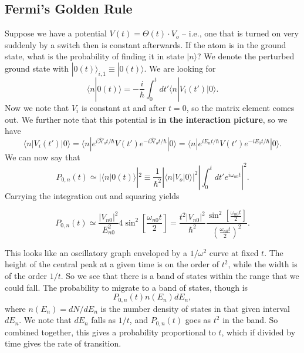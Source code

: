 \documentclass[fontsize=12pt]{scrartcl}
\newcommand{\la}{\langle}
\newcommand{\ra}{\rangle}
\newcommand{\Ham}{\hat{\mathcal{H}}}
\begin{document}
\subsection{Fermi's Golden Rule}


Suppose we have a potential $V(t)=\Theta(t)\cdot V_o$ -- i.e., one that is turned on very suddenly by a switch then is constant afterwards. If the atom is in the ground state, what is the probability of finding it in state $|n\ra$? We denote the perturbed ground state with $|0(t)\ra_{i, 1}\equiv |0(t)\ra$. We are looking for $$\la n |0(t)\ra = -\frac{i}{\hbar}\int_0^t dt' \la n|V_i(t')|0\ra.$$ Now we note that $V_i$ is constant at and after $t=0$, so the matrix element comes out. We further note that this potential is \textbf{in the interaction picture}, so we have $$\la n |V_i(t')|0\ra = \la n | e^{i\Ham_ot/\hbar}V(t')e^{-i\Ham_ot/\hbar}|0\ra = \la n| e^{iE_nt/\hbar}V(t')e^{-iE_0t/\hbar}|0\ra.$$ We can now say that $$P_{0,n}(t)\simeq |\la n|0(t)\ra|^2 \equiv \frac{1}{\hbar^2}|\la n |V_o|0\ra|^2 \left|\int_0^t dt' e^{i\omega_{n0}t}\right|^2.$$ Carrying the integration out and squaring yields \begin{mdframed} $$P_{0,n}(t)\simeq \frac{|V_{n0}|^2}{E_{n0}^2} 4\sin^2\left[\frac{\omega_{n0}t}{2}\right] = \frac{t^2|V_{n0}|^2}{\hbar^2} \frac{\sin^2\left[\frac{\omega_{n0}t}{2}\right]}{\left(\frac{\omega_{n0}t}{2}\right)^2}.$$ \end{mdframed} This looks like an oscillatory graph enveloped by a $1/\omega^2$ curve at fixed $t$. The height of the central peak at a given time is on the order of $t^2$, while the width is of the order $1/t$. So we see that there is a band of states within the range that we could fall. The probability to migrate to a band of states, though is $$P_{0,n}(t)n(E_n)dE_n,$$ where $n(E_n)=dN/dE_n$ is the number density of states in that given interval $dE_n$. We note that $dE_n$ falls as $1/t$, and $P_{0,n}(t)$ goes as $t^2$ in the band. So combined together, this gives a probability proportional to $t$, which if divided by time gives the rate of transition.
\end{document}

